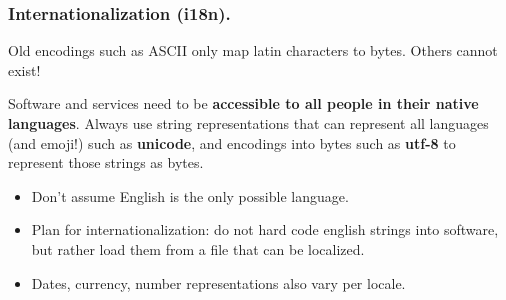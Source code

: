 \documentclass{beamer} %
\newcommand\emc[1]{\textcolor{midred}{\textbf{#1}}}
\begin{document}
\begin{frame}
\frametitle{Internationalization (i18n).}

Old encodings such as ASCII only map latin characters to bytes. Others cannot exist!

\vspace{3mm}
Software and services need to be \emc{accessible to all people in their native languages}. Always use string representations that can represent all languages (and emoji!) such as \emc{unicode}, and encodings into bytes such as \emc{utf-8} to represent those strings as bytes.

\begin{itemize}
\item Don't assume English is the only possible language.
\item Plan for internationalization: do not hard code english strings into software, but rather load them from a file that can be localized.
\item Dates, currency, number representations also vary per locale.
\end{itemize}

\end{frame}


\end{document}
